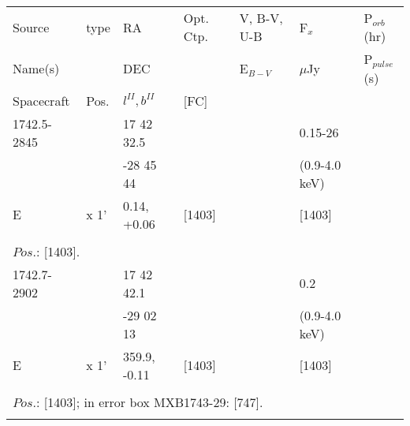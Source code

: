 \documentclass{aa}
\begin{document}
\begin{tabular}{p{2.5cm}p{1cm}p{1.8cm}p{2.3cm}p{3.3cm}p{2.0cm}p{2.2cm}}
\noalign{\smallskip}
\multicolumn{7}{p{17.5cm}}{Table 1.  (continued) }\\        
\hline
\noalign{\smallskip}
Source         & type  & RA                       &  Opt. Ctp. & V, B-V, U-B  & F$_{x}$          & P$_{orb}$(hr)    \\
Name(s)       &            & DEC                    &                     & E$_{B-V}$   & $\mu$Jy        & P$_{pulse}$(s) \\
Spacecraft & Pos.  & $l^{II}, b^{II}$      &  [FC]           &                        &                         &                             \\
\noalign{\smallskip} 
\hline

\noalign{\smallskip}
1742.5-2845             &                 & 17 42 32.5            &                       &                          & 0.15-26                   &              \\
                                    &                 & -28 45 44              &                       &                          & (0.9-4.0 keV)          &                 \\
E                                 & x 1'          & 0.14, +0.06           & [1403]           &                          & [1403]                      &            \\
\\
\multicolumn{7}{p{17.5cm}}{
$Pos$.: [1403].}\\
\noalign{\smallskip}
\hline

\noalign{\smallskip}
1742.7-2902     &                   & 17 42 42.1           &                        &                          & 0.2                       &            \\
                            &                   & -29 02 13             &                       &                           & (0.9-4.0 keV)     &                \\
      E                   & x 1'            & 359.9, -0.11         & [1403]           &                          & [1403]                  &          \\
\\
\multicolumn{7}{p{17.5cm}}{
$Pos$.: [1403]; in error box MXB1743-29: [747].}\\
\noalign{\smallskip}
\hline


\end{tabular}
\end{document}

